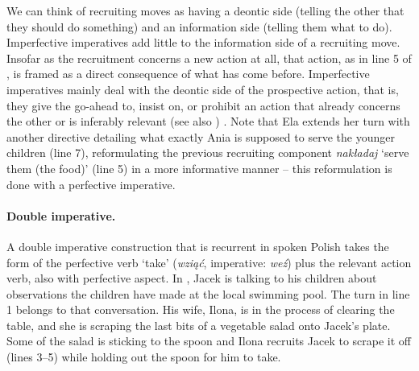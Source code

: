 \documentclass[output=paper]{langsci/langscibook}
\begin{document}
We can think of recruiting moves as having a deontic side (telling the other that they should do something) and an information side (telling them what to do).  Imperfective imperatives add little to the information side of a recruiting move. Insofar as the recruitment concerns a new action at all, that action, as in line 5 of , is framed as a direct consequence of what has come before. Imperfective imperatives mainly deal with the deontic side of the prospective action, that is, they give the go-ahead to, insist on, or prohibit an action that already concerns the other or is inferably relevant (see also ) \citep[chap. 8]{Zinken2016}.  Note that Ela extends her turn with another directive detailing what exactly Ania is supposed to serve the younger children (line 7), reformulating the previous recruiting component \textit{nakładaj} `serve them (the food)' (line 5) in a more informative manner -- this reformulation is done with a perfective imperative.

\paragraph{Double imperative.} A double imperative construction that is recurrent in spoken Polish takes the form of the perfective verb `take' (\textit{wziąć}, imperative: \textit{weź}) plus the relevant action verb, also with perfective aspect.  In , Jacek is talking to his children about observations the children have made at the local swimming pool.  The turn in line 1 belongs to that conversation.  His wife, Ilona, is in the process of clearing the table, and she is scraping the last bits of a vegetable salad onto Jacek’s plate.  Some of the salad is sticking to the spoon and Ilona recruits Jacek to scrape it off (lines 3--5) while holding out the spoon for him to take.
\end{document}
